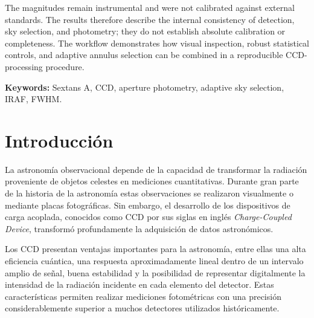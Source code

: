 \documentclass[12pt,letterpaper,oneside]{book}
\begin{document}
The magnitudes remain instrumental and were not calibrated against external standards. The results therefore describe the internal consistency of detection, sky selection, and photometry; they do not establish absolute calibration or completeness. The workflow demonstrates how visual inspection, robust statistical controls, and adaptive annulus selection can be combined in a reproducible CCD-processing procedure.

\vspace{5mm}

\noindent
\textbf{Keywords:}
Sextans A, CCD, aperture photometry, adaptive sky selection, IRAF, FWHM.



\mainmatter

\tableofcontents

\newpage

\listoffigures

\listoftables


\newpage

\visibleintentfalse



\chapter{Introducción}

La astronomía observacional depende de la capacidad de transformar la radiación proveniente de objetos celestes en mediciones cuantitativas. Durante gran parte de la historia de la astronomía estas observaciones se realizaron visualmente o mediante placas fotográficas. Sin embargo, el desarrollo de los dispositivos de carga acoplada, conocidos como CCD por sus siglas en inglés \textit{Charge-Coupled Device}, transformó profundamente la adquisición de datos astronómicos.

Los CCD presentan ventajas importantes para la astronomía, entre ellas una alta eficiencia cuántica, una respuesta aproximadamente lineal dentro de un intervalo amplio de señal, buena estabilidad y la posibilidad de representar digitalmente la intensidad de la radiación incidente en cada elemento del detector. Estas características permiten realizar mediciones fotométricas con una precisión considerablemente superior a muchos detectores utilizados históricamente.
\end{document}
